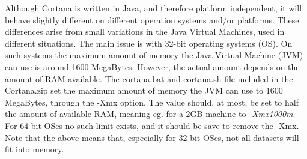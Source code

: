 \documentclass{article}
\begin{document}
Although Cortana is written in Java, and therefore platform independent, it will behave slightly different on different operation systems and/or platforms.
These differences arise from small variations in the Java Virtual Machines, used in different situations.
The main issue is with 32-bit operating systems (OS).
On such systems the maximum amount of memory the Java Virtual Machine (JVM) can use is around 1600 MegaBytes.
However, the actual amount depends on the amount of RAM available.
The cortana.bat and cortana.sh file included in the Cortana.zip set the maximum amount of memory the JVM can use to 1600 MegaBytes, through the -Xmx option.
The value should, at most, be set to half the amount of available RAM, meaning eg. for a 2GB machine to \emph{-Xmx1000m}.
For 64-bit OSes no such limit exists, and it should be save to remove the -Xmx.
Note that the above means that, especially for 32-bit OSes, not all datasets will fit into memory.
\end{document}
